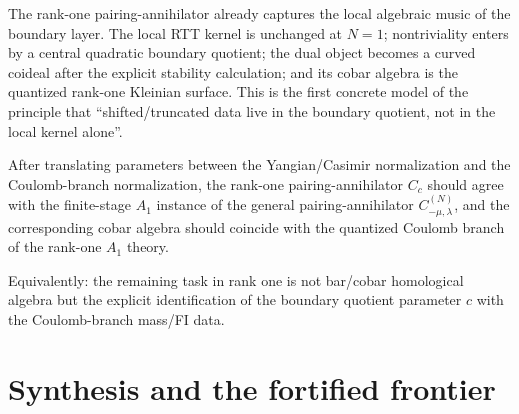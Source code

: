 \begin{remark}[Interpretation]
\label{rem:rank-one-interpretation}
The rank-one pairing-annihilator already captures the local algebraic music of
the boundary layer. The local RTT kernel is unchanged at $N=1$;
nontriviality enters by a central quadratic boundary quotient; the dual object
becomes a curved coideal after the explicit stability calculation; and its
cobar algebra is the quantized rank-one
Kleinian surface. This is the first concrete model of the principle that
``shifted/truncated data live in the boundary quotient, not in the local kernel
alone''.
\end{remark}

\begin{conjecture}
\label{conj:rank-one-bfn-matching}
After translating parameters between the Yangian/Casimir normalization and the
Coulomb-branch normalization, the rank-one pairing-annihilator $C_c$ should agree
with the finite-stage $A_1$ instance of the general pairing-annihilator
$C_{-\mu,\lambda}^{(N)}$, and the corresponding cobar algebra should coincide
with the quantized Coulomb branch of the rank-one $A_1$ theory.

Equivalently: the remaining task in rank one is not bar/cobar homological
algebra but the explicit identification of the boundary quotient parameter $c$
with the Coulomb-branch mass/FI data.
\end{conjecture}

\section{Synthesis and the fortified frontier}
\label{sec:synthesis-fortified-frontier}

